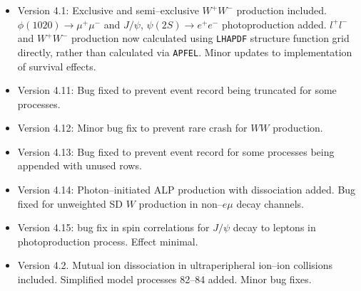 \documentclass[12pt]{article}
\begin{document}
\begin{itemize}
\item Version 4.1: Exclusive and semi--exclusive $W^+ W^-$ production included.  $\phi(1020)\to \mu^+ \mu^-$ and $J/\psi$, $\psi(2S) \to e^+ e^-$ photoproduction added. $l^+ l^-$ and $W^+ W^-$ production now calculated using \texttt{LHAPDF} structure function grid directly, rather than calculated via \texttt{APFEL}. Minor updates to implementation of survival effects.
\item Version 4.11: Bug fixed to prevent event record being truncated for some processes.
\item Version 4.12: Minor bug fix to prevent rare crash for $WW$ production.
\item Version 4.13: Bug fixed to prevent event record for some processes being appended with unused rows.
\item Version 4.14: Photon--initiated ALP production with dissociation added. Bug fixed for unweighted SD $W$ production in non--$e\mu$ decay channels.
\item Version 4.15: bug fix in spin correlations for $J/\psi$ decay to leptons in photoproduction process. Effect minimal.
\item Version 4.2. Mutual ion dissociation in ultraperipheral ion--ion collisions included. Simplified model processes 82--84 added. Minor bug fixes.

\end{itemize}


%
{}

\end{document}
